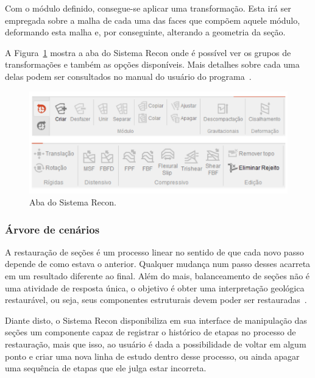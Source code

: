 Com o módulo definido, consegue-se aplicar uma transformação. Esta irá ser empregada sobre a malha de cada uma das faces que compõem aquele módulo, deformando esta malha e, por conseguinte, alterando a geometria da seção.

A Figura~\ref{fig-recon-5} mostra a aba  do Sistema Recon onde é possível ver os grupos de transformações e também as opções disponíveis. Mais detalhes sobre cada uma delas podem ser consultados no manual do usuário do programa~\cite{Recon}.

\begin{figure} [H]
  \begin{center}
    \includegraphics[width=\textwidth]{images/fig-recon-5}
    \caption{Aba  do Sistema Recon.}\label{fig-recon-5}
  \end{center}
\end{figure}

\subsubsection{Árvore de cenários}

A restauração de seções é um processo linear no sentido de que cada novo passo depende de como estava o anterior. Qualquer mudança num passo desses acarreta em um resultado diferente ao final. Além do mais, balanceamento de seções não é uma atividade de resposta única, o objetivo é obter uma interpretação geológica restaurável, ou seja, seus componentes estruturais devem poder ser restauradas~\cite{Fossen}. 

Diante disto, o Sistema Recon disponibiliza em sua interface de manipulação das seções um componente capaz de registrar o histórico de etapas no processo de restauração, mais que isso, ao usuário é dada a possibilidade de voltar em algum ponto e criar uma nova linha de estudo dentro desse processo, ou ainda apagar uma sequência de etapas que ele julga estar incorreta.

